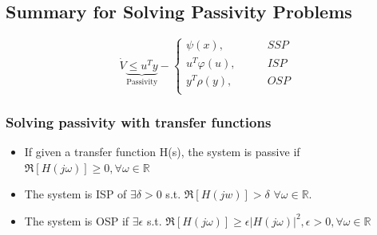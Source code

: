 \documentclass{article}
\newcommand{\mathbbR}{\mathbb{R}}
\begin{document}
\subsection{Summary for Solving Passivity Problems}
\begin{equation}
	\dot{V} \underbrace{\leq u^{T}y}_\text{Passivity} - \begin{cases}
		\psi (x), \qquad &SSP \\
		u^{T}\varphi(u), \qquad &ISP \\
		y^{T}\rho(y), \qquad &OSP \\

	\end{cases}
\end{equation}

\subsubsection{Solving passivity with transfer functions}
\begin{itemize}
    \item If given a transfer function H(s), the system is passive if $\mathfrak{R}[H(j\omega)]\geq0, \forall \omega\in\mathbbR$
    \item The system is ISP of $\exists\delta>0$ s.t. $\mathfrak{R}[H(jw)]>\delta$ $\forall \omega\in\mathbbR$.
    \item The system is OSP if $\exists\epsilon$ s.t. $\mathfrak{R}[H(j\omega)] \geq \epsilon|H(j\omega)|^2, \epsilon > 0, \forall \omega \in \mathbbR$ 
\end{itemize}
\end{document}
